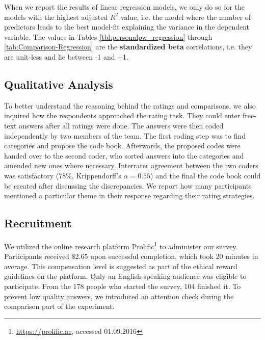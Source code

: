 When we report the results of linear regression models, we only do so for the models with the highest adjusted $R^2$ value, i.e. the model where the number of predictors leads to the best model-fit explaining the variance in the dependent variable. The values in Tables \ref{tbl:personalpw_regression} through \ref{tab:Comparison-Regression} are the \textbf{standardized beta} correlations, i.e. they are unit-less and lie between -1 and +1. 

\subsection{Qualitative Analysis}
To better understand the reasoning behind the ratings and comparisons, we also inquired how the respondents approached the rating task. They could enter free-text answers after all ratings were done. The answers were then coded independently by two members of the team. The first coding step was to find categories and propose the code book. Afterwards, the proposed codes were handed over to the second coder, who sorted answers into the categories and amended new ones where necessary. Interrater agreement between the two coders was satisfactory (78\%, Krippendorff's $\alpha = 0.55$) and the final the code book could be created after discussing the discrepancies. We report how many participants mentioned a particular theme in their response regarding their rating strategies.


\subsection{Recruitment}
We utilized the online research platform Prolific\footnote{\url{https://prolific.ac}, accessed 01.09.2016} to administer our survey. Participants received \$2.65 upon successful completion, which took 20 minutes in average. This compensation level is suggested as part of the ethical reward guidelines on the platform. Only an English-speaking audience was eligible to participate. From the 178 people who started the survey, 104 finished it. To prevent low quality answers, we introduced an attention check during the comparison part of the experiment.  



